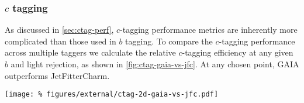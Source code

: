 \subsubsection{$c$ tagging}

As discussed in \cref{sec:ctag-perf}, $c$-tagging performance metrics are inherently more complicated than those used in $b$ tagging.
To compare the $c$-tagging performance across multiple taggers we calculate the relative $c$-tagging efficiency at any given $b$ and light rejection, as shown in \cref{fig:ctag-gaia-vs-jfc}.
At any chosen point, GAIA outperforms JetFitterCharm.

\begin{cfig}
  \texttt{[image: \%
    figures/external/ctag-2d-gaia-vs-jfc.pdf]}
  \caption[Charm jet efficiency comparison in duel-rejection plane]{%
    Relative efficiency of GAIA / JetFitterCharm in the light-vs-$b$ rejection plane. Black thick black contours indicate constant efficiency for GAIA.}
  \label{fig:ctag-gaia-vs-jfc}
\end{cfig}
